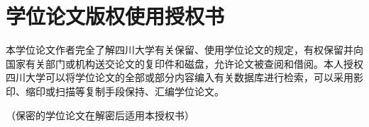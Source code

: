 
\chapter*{学位论文版权使用授权书}
本学位论文作者完全了解{四川大学}有关保留、使用学位论文的规定，有权保留并向国家有关部门或机构送交论文的复印件和磁盘，允许论文被查阅和借阅。本人授权{四川大学}可以将学位论文的全部或部分内容编入有关数据库进行检索，可以采用影印、缩印或扫描等复制手段保持、汇编学位论文。


（保密的学位论文在解密后适用本授权书）
\vspace{4cm}
\autograph
